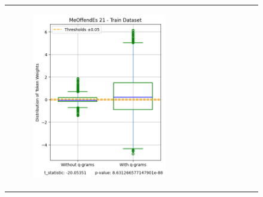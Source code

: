 \documentclass[runningheads,10pt]{llncs}
\begin{document}
\begin{figure}[t]
\begin{tabular}{c c c}
\begin{subfigure}{0.32\textwidth}
            \centering
            \includegraphics[width=\linewidth]{fig_meoffendes_21_train_0_05.png}
            \label{fig:image2}
        \end{subfigure} &
        \begin{subfigure}{0.32\textwidth}
            \centering

\end{subfigure}
\end{tabular}
\end{figure}
\end{document}
